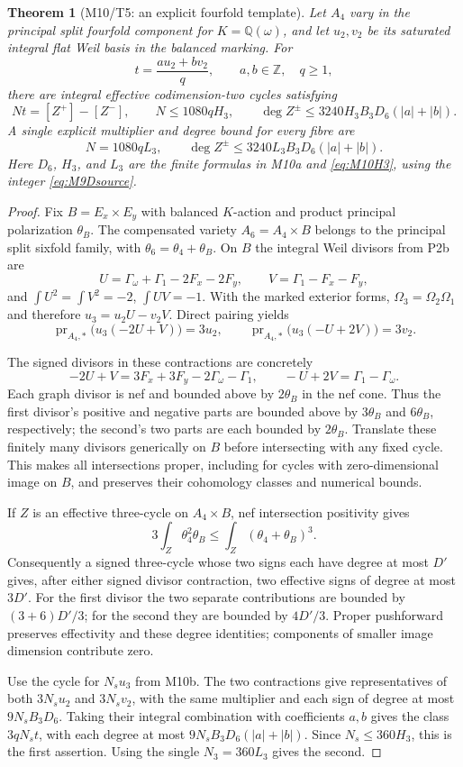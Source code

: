 \documentclass[11pt,a4paper]{article}
\newtheorem{theorem}{Theorem}[section]
\theoremstyle{definition}\newtheorem{definition}[theorem]{Definition}
\theoremstyle{remark}\newtheorem{remark}[theorem]{Remark}
\newcommand{\Q}{\mathbb Q}\newcommand{\Z}{\mathbb Z}\newcommand{\C}{\mathbb C}\newcommand{\R}{\mathbb R}
\begin{document}
\begin{theorem}[M10/T5: an explicit fourfold template]\label{M10}
Let $A_4$ vary in the principal split fourfold component for
$K=\Q(\omega)$, and let $u_2,v_2$ be its saturated integral flat
Weil basis in the balanced marking. For
\[
 t=\frac{a u_2+b v_2}{q},\qquad a,b\in\Z,\quad q\ge1,
\]
there are integral effective codimension-two cycles satisfying
\[
 Nt=[Z^+]-[Z^-],\qquad
 N\le1080qH_3,\qquad
 \deg Z^\pm\le3240H_3B_3D_6(|a|+|b|).
\]
A single explicit multiplier and degree bound for every fibre are
\[
 N=1080qL_3,\qquad
 \deg Z^\pm\le3240L_3B_3D_6(|a|+|b|).
\]
Here $D_6$, $H_3$, and $L_3$ are the finite formulas in M10a and
\eqref{eq:M10H3}, using the integer \eqref{eq:M9Dsource}.
\end{theorem}
\begin{proof}
Fix $B=E_x\times E_y$ with balanced $K$-action and product principal
polarization $\theta_B$. The compensated variety
$A_6=A_4\times B$ belongs to the principal split sixfold family,
with $\theta_6=\theta_4+\theta_B$.
On $B$ the integral Weil divisors from P2b are
\[
 U=\Gamma_\omega+\Gamma_1-2F_x-2F_y,\qquad
 V=\Gamma_1-F_x-F_y,
\]
and
$\int U^2=\int V^2=-2$, $\int UV=-1$.
With the marked exterior forms,
$\Omega_3=\Omega_2\Omega_1$ and therefore
$u_3=u_2U-v_2V$. Direct pairing yields
\[
 \operatorname{pr}_{A_4,*}\bigl(u_3(-2U+V)\bigr)=3u_2,
 \qquad
 \operatorname{pr}_{A_4,*}\bigl(u_3(-U+2V)\bigr)=3v_2.
\]

The signed divisors in these contractions are concretely
\[
 -2U+V=3F_x+3F_y-2\Gamma_\omega-\Gamma_1,\qquad
 -U+2V=\Gamma_1-\Gamma_\omega.
\]
Each graph divisor is nef and bounded above by $2\theta_B$ in the
nef cone. Thus the first divisor's positive and negative parts
are bounded above by $3\theta_B$ and $6\theta_B$, respectively;
the second's two parts are each bounded by $2\theta_B$.
Translate these finitely many divisors generically on $B$ before
intersecting with any fixed cycle. This makes all intersections
proper, including for cycles with zero-dimensional image on $B$,
and preserves their cohomology classes and numerical bounds.

If $Z$ is an effective three-cycle on $A_4\times B$, nef
intersection positivity gives
\[
 3\int_Z\theta_4^2\theta_B
 \le\int_Z(\theta_4+\theta_B)^3.
\]
Consequently a signed three-cycle whose two signs each have degree
at most $D'$ gives, after either signed divisor contraction, two
effective signs of degree at most $3D'$.
For the first divisor the two separate contributions are bounded
by $(3+6)D'/3$; for the second they are bounded by $4D'/3$.
Proper pushforward preserves effectivity and these degree
identities; components of smaller image dimension contribute zero.

Use the cycle for $N_su_3$ from M10b. The two contractions give
representatives of both $3N_su_2$ and $3N_sv_2$, with the same
multiplier and each sign of degree at most $9N_sB_3D_6$.
Taking their integral combination with coefficients $a,b$ gives
the class $3qN_st$, with each degree at most
$9N_sB_3D_6(|a|+|b|)$. Since $N_s\le360H_3$, this is the first
assertion. Using the single $N_3=360L_3$ gives the second.
\end{proof}
\end{document}
